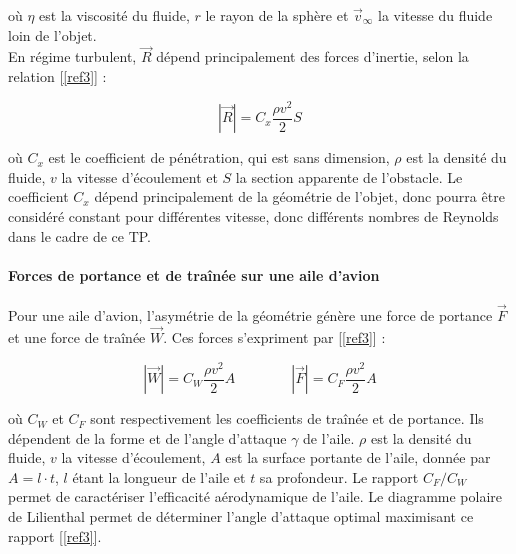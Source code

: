 \documentclass[a4paper, 12pt,oneside]{article}
\begin{document}
\vspace{-0.1cm}

\noindent où $\eta$ est la viscosité du fluide, $r$ le rayon de la sphère et $\vec{v}_\infty$ la vitesse du fluide loin de l’objet.  
\\
En régime turbulent, $\vec{R}$ dépend principalement des forces d’inertie, selon la relation [\ref{ref3}] :

\vspace{-0.15cm}

\begin{equation}
|\vec{R}| = C_x \frac{\rho v^2}{2} S
\label{eq3}
\end{equation}

\noindent où $C_x$ est le coefficient de pénétration, qui est sans dimension, $\rho$ est la densité du fluide, $v$ la vitesse d’écoulement et $S$ la section apparente de l’obstacle. Le coefficient $C_x$ dépend principalement de la géométrie de l’objet, donc pourra être considéré constant pour différentes vitesse, donc différents nombres de Reynolds dans le cadre de ce TP.

\paragraph{Forces de portance et de traînée sur une aile d’avion}

Pour une aile d’avion, l’asymétrie de la géométrie génère une force de portance $\vec{F}$ et une force de traînée $\vec{W}$. Ces forces s’expriment par [\ref{ref3}] :

\vspace{-0.2cm}

\begin{equation}
|\vec{W}| = C_W \frac{\rho v^2}{2} A \quad \quad \quad \quad |\vec{F}| = C_F \frac{\rho v^2}{2} A
\label{eq4}
\end{equation}

\noindent où $C_W$ et $C_F$ sont respectivement les coefficients de traînée et de portance. Ils dépendent de la forme et de l’angle d’attaque $\gamma$ de l’aile. $\rho$ est la densité du fluide, $v$ la vitesse d’écoulement,  $A$ est la surface portante de l’aile, donnée par $A = l \cdot t$, $l$ étant la longueur de l'aile et $t$ sa profondeur. Le rapport $C_F/C_W$ permet de caractériser l’efficacité aérodynamique de l’aile. Le diagramme polaire de Lilienthal permet de déterminer l’angle d’attaque optimal maximisant ce rapport [\ref{ref3}].  

\vspace{-0.25cm}
\end{document}
